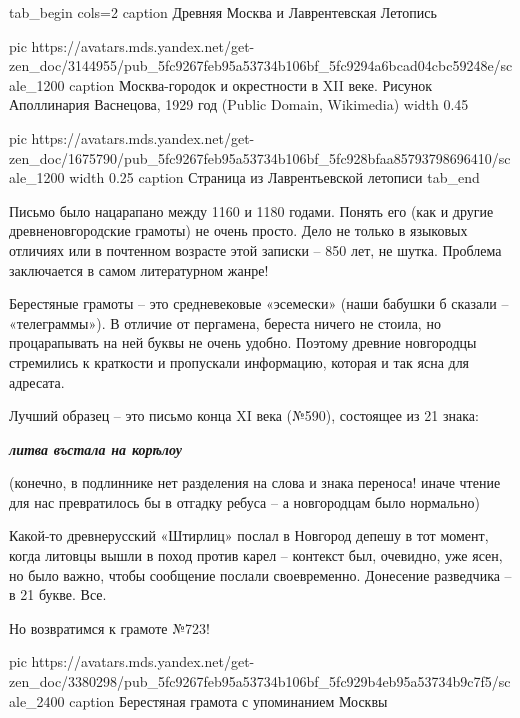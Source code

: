 \ifcmt
tab_begin cols=2
  caption Древняя Москва и Лаврентевская Летопись

  pic https://avatars.mds.yandex.net/get-zen_doc/3144955/pub_5fc9267feb95a53734b106bf_5fc9294a6bcad04cbc59248e/scale_1200
  caption Москва-городок и окрестности в XII веке. Рисунок Аполлинария Васнецова, 1929 год (Public Domain, Wikimedia)
  width 0.45

  pic https://avatars.mds.yandex.net/get-zen_doc/1675790/pub_5fc9267feb95a53734b106bf_5fc928bfaa85793798696410/scale_1200
  width 0.25
  caption Страница из Лаврентьевской летописи
tab_end
\fi

\begin{multicols}{2}
        

Письмо было нацарапано между 1160 и 1180 годами. Понять его (как и другие
древненовгородские грамоты) не очень просто. Дело не только в языковых отличиях
или в почтенном возрасте этой записки – 850 лет, не шутка. Проблема заключается
в самом литературном жанре!

Берестяные грамоты – это средневековые «эсемески» (наши бабушки б сказали –
«телеграммы»). В отличие от пергамена, береста ничего не стоила, но
процарапывать на ней буквы не очень удобно. Поэтому древние новгородцы
стремились к краткости и пропускали информацию, которая и так ясна для
адресата.

Лучший образец – это письмо конца XI века (№590), состоящее из 21 знака:

\begin{leftbar}
  \begingroup
    \em\Large\bfseries\color{blue}
    литва въстала на корѣлоу
  \endgroup
\end{leftbar}

(конечно, в подлиннике нет разделения на слова и знака переноса! иначе чтение
для нас превратилось бы в отгадку ребуса – а новгородцам было нормально)

Какой-то древнерусский «Штирлиц» послал в Новгород депешу в тот момент, когда
литовцы вышли в поход против карел – контекст был, очевидно, уже ясен, но было
важно, чтобы сообщение послали своевременно. Донесение разведчика – в 21 букве.
Все.

Но возвратимся к грамоте №723!

\end{multicols}

\ifcmt
pic https://avatars.mds.yandex.net/get-zen_doc/3380298/pub_5fc9267feb95a53734b106bf_5fc929b4eb95a53734b9c7f5/scale_2400
caption Берестяная грамота с упоминанием Москвы
\fi

